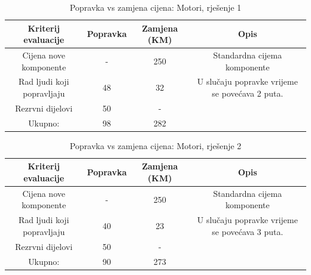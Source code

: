 \documentclass[12pt]{article}
\begin{document}
\begin{landscape}
\vspace*{\fill}
\begin{table}[htbp]
  \centering
\footnotesize
  \caption{Popravka vs zamjena cijena: Motori, rješenje 1}
    \begin{tabular}{cccc}
    \toprule
    Kriterij evaluacije & Popravka & Zamjena (KM) & Opis \\
    \midrule
     Cijena nove komponente & -     & 250   & \multicolumn{1}{p{19.57em}}{Standardna \newline{}cijema\newline{} komponente} \\
    \midrule
    Rad ljudi koji popravljaju & 48    & 32    & \multicolumn{1}{p{19.57em}}{ U slučaju popravke vrijeme se povećava 2 puta. } \\
    \midrule
    Rezrvni dijelovi & 50    & -     &  \\
    \midrule
    Ukupno: & 98    & 282   &  \\
    \bottomrule
    \end{tabular}%
  \label{tab:popravka3}%
\end{table}%

\begin{table}[htbp]
\footnotesize
  \centering
  \caption{Popravka vs zamjena cijena: Motori, rješenje 2 }
    \begin{tabular}{cccc}
    \toprule
    Kriterij evaluacije & Popravka & Zamjena (KM) & Opis \\
    \midrule
     Cijena nove komponente & -     & 250   & \multicolumn{1}{p{23.215em}}{Standardna \newline{}cijema\newline{} komponente} \\
    \midrule
    Rad ljudi koji popravljaju & 40    & 23    & \multicolumn{1}{p{23.215em}}{ U slučaju popravke vrijeme se povećava 3 puta. } \\
    \midrule
    Rezrvni dijelovi & 50    & -     &  \\
    \midrule
    Ukupno: & 90    & 273   &  \\
    \bottomrule
    \end{tabular}%
  \label{tab:popravka4}%
\end{table}%
\vspace*{\fill}
\end{landscape}
\end{document}
